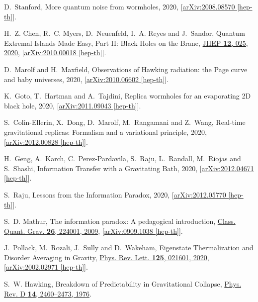 \documentclass[11pt]{article}
\numberwithin{equation}{section}
\begin{document}
\begin{thebibliography}{10}
D.~Stanford, {{More quantum noise from wormholes}},  2020,
  [\href{http://arxiv.org/abs/arXiv:2008.08570}{{arXiv:2008.08570 [hep-th]}}].

H.~Z. Chen, R.~C. Myers, D.~Neuenfeld, I.~A. Reyes and J.~Sandor, {{Quantum
  Extremal Islands Made Easy, Part II: Black Holes on the Brane}},
  \href{http://dx.doi.org/10.1007/JHEP12(2020)025}{JHEP {\bf 12}, 025, 2020},
  [\href{http://arxiv.org/abs/arXiv:2010.00018}{{arXiv:2010.00018 [hep-th]}}].

D.~Marolf and H.~Maxfield, {{Observations of Hawking radiation: the Page curve
  and baby universes}},  2020,
  [\href{http://arxiv.org/abs/arXiv:2010.06602}{{arXiv:2010.06602 [hep-th]}}].

K.~Goto, T.~Hartman and A.~Tajdini, {{Replica wormholes for an evaporating 2D
  black hole}},  2020,
  [\href{http://arxiv.org/abs/arXiv:2011.09043}{{arXiv:2011.09043 [hep-th]}}].

S.~Colin-Ellerin, X.~Dong, D.~Marolf, M.~Rangamani and Z.~Wang, {{Real-time
  gravitational replicas: Formalism and a variational principle}},  2020,
  [\href{http://arxiv.org/abs/arXiv:2012.00828}{{arXiv:2012.00828 [hep-th]}}].

H.~Geng, A.~Karch, C.~Perez-Pardavila, S.~Raju, L.~Randall, M.~Riojas and
  S.~Shashi, {{Information Transfer with a Gravitating Bath}},  2020,
  [\href{http://arxiv.org/abs/arXiv:2012.04671}{{arXiv:2012.04671 [hep-th]}}].

S.~Raju, {{Lessons from the Information Paradox}},  2020,
  [\href{http://arxiv.org/abs/arXiv:2012.05770}{{arXiv:2012.05770 [hep-th]}}].

S.~D. Mathur, {{The information paradox: A pedagogical introduction}},
  \href{http://dx.doi.org/10.1088/0264-9381/26/22/224001}{Class. Quant. Grav.
  {\bf 26}, 224001, 2009},
  [\href{http://arxiv.org/abs/arXiv:0909.1038}{{arXiv:0909.1038 [hep-th]}}].

J.~Pollack, M.~Rozali, J.~Sully and D.~Wakeham, {{Eigenstate Thermalization and
  Disorder Averaging in Gravity}},
  \href{http://dx.doi.org/10.1103/PhysRevLett.125.021601}{Phys. Rev. Lett. {\bf
  125}, 021601, 2020},
  [\href{http://arxiv.org/abs/arXiv:2002.02971}{{arXiv:2002.02971 [hep-th]}}].

S.~W. Hawking, {{Breakdown of Predictability in Gravitational Collapse}},
  \href{http://dx.doi.org/10.1103/PhysRevD.14.2460}{Phys. Rev. D {\bf 14},
  2460--2473, 1976}.


\end{thebibliography}
\end{document}
